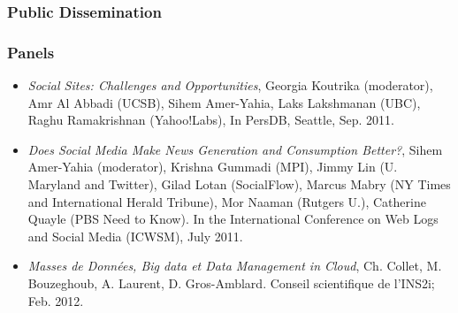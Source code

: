 
\subsubsection{Public Dissemination}

\subsubsection*{Panels}

\begin{itemize}

\item \emph{Social Sites: Challenges and Opportunities}, Georgia Koutrika (moderator), Amr Al Abbadi (UCSB), Sihem Amer-Yahia, Laks Lakshmanan
  (UBC), Raghu Ramakrishnan (Yahoo!Labs), In PersDB, Seattle, Sep. 2011.

\item \emph{Does Social Media Make News Generation and Consumption Better?}, Sihem Amer-Yahia (moderator), Krishna Gummadi (MPI), Jimmy Lin
  (U. Maryland and Twitter), Gilad Lotan (SocialFlow), Marcus Mabry (NY Times and International Herald Tribune), Mor Naaman (Rutgers
  U.), Catherine Quayle (PBS Need to Know). In the International  Conference on Web Logs and Social Media (ICWSM), July 2011.




\item \emph{Masses de Donn{\'e}es, Big data et Data Management in Cloud}, Ch. Collet, M. Bouzeghoub, A. Laurent, D. Gros-Amblard. Conseil scientifique de l'INS2i; Feb. 2012. 

\end{itemize}

